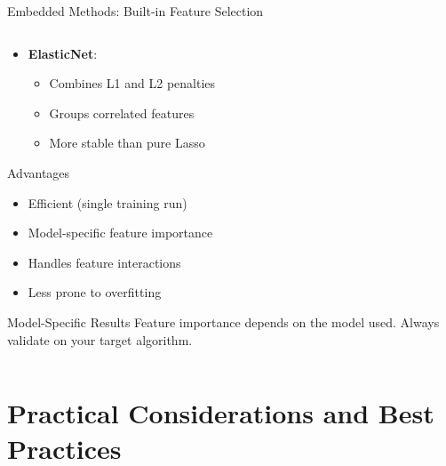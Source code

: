 \documentclass[aspectratio=169,11pt]{beamer}
\begin{document}
\begin{frame}[fragile]{Embedded Methods: Built-in Feature Selection}
\begin{columns}
\begin{column}{0.45\textwidth}
\begin{itemize}
\item \textbf{ElasticNet}:
  \begin{itemize}
  \item Combines L1 and L2 penalties
  \item Groups correlated features
  \item More stable than pure Lasso
  \end{itemize}
\end{itemize}

\vspace{0.3cm}
\begin{block}{Advantages}
\begin{itemize}
\item Efficient (single training run)
\item Model-specific feature importance
\item Handles feature interactions
\item Less prone to overfitting
\end{itemize}
\end{block}

\begin{alertblock}{Model-Specific Results}
Feature importance depends on the model used. Always validate on your target algorithm.
\end{alertblock}
\end{column}
\end{columns}
\end{frame}

\section{Practical Considerations and Best Practices}
\end{document}
